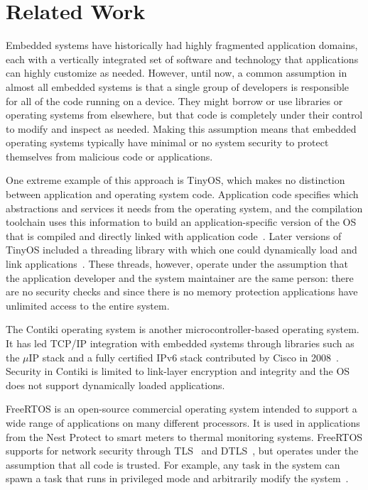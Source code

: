 \section{Related Work}

Embedded systems have historically had highly fragmented application domains,
each with a vertically integrated set of software and technology that
applications can highly customize as needed. However, until now, a common
assumption in almost all embedded systems is that a single group of developers
is responsible for all of the code running on a device. They might borrow
or use libraries or operating systems from elsewhere, but that code is 
completely under their control to modify and inspect as needed. Making
this assumption means that embedded operating systems typically have
minimal or no system security to protect themselves from malicious code
or applications.

One extreme example of this approach is TinyOS, which makes no
distinction between application and operating system code. Application
code specifies which abstractions and services it needs from the
operating system, and the compilation toolchain uses this information
to build an application-specific version of the OS that is compiled
and directly linked with application code~\cite{tinyos}. Later
versions of TinyOS included a threading library with which one could
dynamically load and link applications~\cite{tosthreads}. These
threads, however, operate under the assumption that the application
developer and the system maintainer are the same person: there are no
security checks and since there is no memory protection applications
have unlimited access to the entire system.

The Contiki operating system is another microcontroller-based
operating system. It has led TCP/IP integration with embedded systems
through libraries such as the $\mu$IP stack and a fully
certified IPv6 stack contributed by Cisco in 2008~\cite{contiki}. 
Security in Contiki is limited to
link-layer encryption and integrity and the OS does not support
dynamically loaded applications.

FreeRTOS is an open-source commercial operating system intended to 
support a wide range of applications on many different processors. It
is used in applications from the Nest Protect to smart meters to
thermal monitoring systems. FreeRTOS supports for network security
through TLS~\cite{tls} and DTLS~\cite{dtls}, but operates under the
assumption that all code is trusted. For example, any task in the system
can spawn a task that runs in privileged mode and arbitrarily modify
the system~\cite{rtos-tasks,rtos-sec}.

